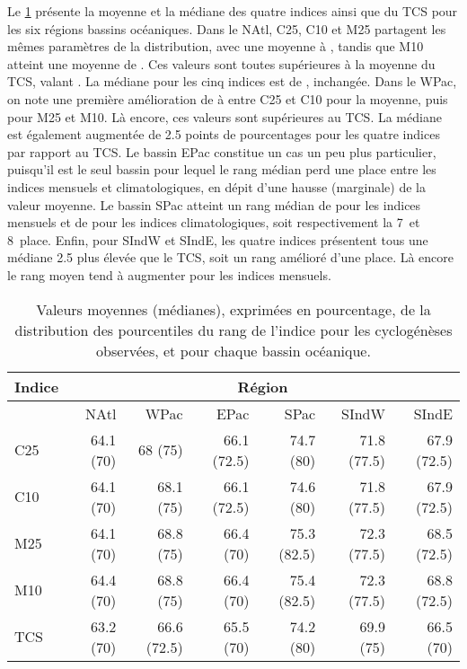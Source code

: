 \documentclass[../main.tex]{subfiles}
\begin{document}
Le \cref{tab:percentiles_indices_all} présente la moyenne et la médiane des quatre indices ainsi que du TCS pour les six régions bassins océaniques. Dans le
NAtl, C25, C10 et M25 partagent les mêmes paramètres de la distribution, avec une moyenne à , tandis que M10 atteint une moyenne de . Ces
valeurs sont toutes supérieures à la moyenne du TCS, valant . La médiane pour les cinq indices est de , inchangée. Dans le WPac, on note une
première amélioration de  à  entre C25 et C10 pour la moyenne, puis  pour M25 et M10. Là encore, ces valeurs sont supérieures au
TCS. La médiane est également augmentée de \num{2.5} points de pourcentages pour les quatre indices par rapport au TCS. Le bassin EPac constitue un cas un peu
plus particulier, puisqu'il est le seul bassin pour lequel le rang médian perd une place entre les indices mensuels et climatologiques, en dépit d'une hausse
(marginale) de la valeur moyenne. Le bassin SPac atteint un rang médian de  pour les indices mensuels et de  pour les indices
climatologiques, soit respectivement la \num{7}\ieme~et \num{8}\ieme~place. Enfin, pour SIndW et SIndE, les quatre indices présentent tous une médiane \num{2.5}
plus élevée que le TCS, soit un rang amélioré d'une place. Là encore le rang moyen tend à augmenter pour les indices mensuels.

\begin{table}[tb]
    \centering
    \caption{Valeurs moyennes (médianes), exprimées en pourcentage, de la distribution des pourcentiles du rang de l'indice pour les cyclogénèses observées, et
    pour chaque bassin océanique.}
    \begin{tabular}{lrrrrrr}
        \toprule\toprule
        Indice & \multicolumn{6}{c}{Région}\\
        \midrule
               & NAtl & WPac & EPac & SPac & SIndW & SIndE \\
        \midrule 
        C25 & \num{64.1} (\num{70}) & \num{68} (\num{75}) & \num{66.1} (\num{72.5}) & \num{74.7} (\num{80}) & \num{71.8} (\num{77.5}) & \num{67.9} (\num{72.5}) \\
        C10 & \num{64.1} (\num{70}) & \num{68.1} (\num{75}) & \num{66.1} (\num{72.5}) & \num{74.6} (\num{80}) & \num{71.8} (\num{77.5}) & \num{67.9} (\num{72.5}) \\
        M25 & \num{64.1} (\num{70}) & \num{68.8} (\num{75}) & \num{66.4} (\num{70}) & \num{75.3} (\num{82.5}) & \num{72.3} (\num{77.5}) & \num{68.5} (\num{72.5}) \\
        M10 & \num{64.4} (\num{70}) & \num{68.8} (\num{75})& \num{66.4} (\num{70}) & \num{75.4} (\num{82.5}) & \num{72.3} (\num{77.5}) & \num{68.8} (\num{72.5}) \\
        \midrule
        TCS & \num{63.2} (\num{70}) & \num{66.6} (\num{72.5}) & \num{65.5} (\num{70}) & \num{74.2} (\num{80}) & \num{69.9} (\num{75}) & \num{66.5} (\num{70}) \\
        \bottomrule
    \end{tabular}
    \label{tab:percentiles_indices_all}
\end{table}
\end{document}
